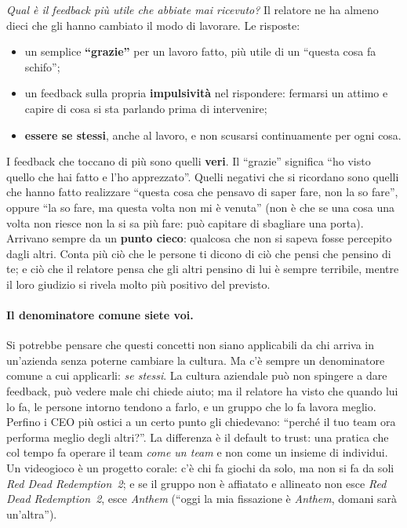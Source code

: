 \emph{Qual è il feedback più utile che abbiate mai ricevuto?} Il relatore ne ha
almeno dieci che gli hanno cambiato il modo di lavorare. Le risposte:
\begin{itemize}
  \item un semplice \textbf{``grazie''} per un lavoro fatto, più utile di un
        ``questa cosa fa schifo'';
  \item un feedback sulla propria \textbf{impulsività} nel rispondere: fermarsi
        un attimo e capire di cosa si sta parlando prima di intervenire;
  \item \textbf{essere se stessi}, anche al lavoro, e non scusarsi
        continuamente per ogni cosa.
\end{itemize}
I feedback che toccano di più sono quelli \textbf{veri}. Il ``grazie''
significa ``ho visto quello che hai fatto e l'ho apprezzato''. Quelli negativi
che si ricordano sono quelli che hanno fatto realizzare ``questa cosa che
pensavo di saper fare, non la so fare'', oppure ``la so fare, ma questa volta
non mi è venuta'' (non è che se una cosa una volta non riesce non la si sa più
fare: può capitare di sbagliare una porta). Arrivano sempre da un
\textbf{punto cieco}: qualcosa che non si sapeva fosse percepito dagli altri.
Conta più ciò che le persone ti dicono di ciò che pensi che pensino di te; e
ciò che il relatore pensa che gli altri pensino di lui è sempre terribile,
mentre il loro giudizio si rivela molto più positivo del previsto.

\paragraph{Il denominatore comune siete voi.} Si potrebbe pensare che questi
concetti non siano applicabili da chi arriva in un'azienda senza poterne
cambiare la cultura. Ma c'è sempre un denominatore comune a cui applicarli:
\emph{se stessi}. La cultura aziendale può non spingere a dare feedback, può
vedere male chi chiede aiuto; ma il relatore ha visto che quando lui lo fa, le
persone intorno tendono a farlo, e un gruppo che lo fa lavora meglio. Perfino
i CEO più ostici a un certo punto gli chiedevano: ``perché il tuo team ora
performa meglio degli altri?''. La differenza è il default to trust: una
pratica che col tempo fa operare il team \emph{come un team} e non come un
insieme di individui. Un videogioco è un progetto corale: c'è chi fa giochi da
solo, ma non si fa da soli \emph{Red Dead Redemption~2}; e se il gruppo non è
affiatato e allineato non esce \emph{Red Dead Redemption~2}, esce
\emph{Anthem} (``oggi la mia fissazione è \emph{Anthem}, domani sarà
un'altra'').

